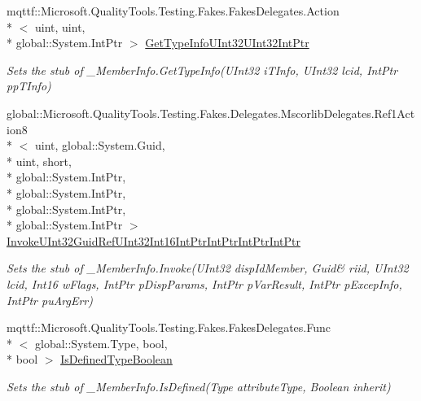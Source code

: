 \begin{DoxyCompactItemize}
mqttf\-::\-Microsoft.\-Quality\-Tools.\-Testing.\-Fakes.\-Fakes\-Delegates.\-Action\\*
$<$ uint, uint, \\*
global\-::\-System.\-Int\-Ptr $>$ \hyperlink{class_system_1_1_runtime_1_1_interop_services_1_1_fakes_1_1_stub___member_info_a767cd0a1bdff27bc6c121b4490e7abb8}{Get\-Type\-Info\-U\-Int32\-U\-Int32\-Int\-Ptr}
\begin{DoxyCompactList}\small\item\em Sets the stub of \-\_\-\-Member\-Info.\-Get\-Type\-Info(\-U\-Int32 i\-T\-Info, U\-Int32 lcid, Int\-Ptr pp\-T\-Info)\end{DoxyCompactList}\item 
global\-::\-Microsoft.\-Quality\-Tools.\-Testing.\-Fakes.\-Delegates.\-Mscorlib\-Delegates.\-Ref1\-Action8\\*
$<$ uint, global\-::\-System.\-Guid, \\*
uint, short, \\*
global\-::\-System.\-Int\-Ptr, \\*
global\-::\-System.\-Int\-Ptr, \\*
global\-::\-System.\-Int\-Ptr, \\*
global\-::\-System.\-Int\-Ptr $>$ \hyperlink{class_system_1_1_runtime_1_1_interop_services_1_1_fakes_1_1_stub___member_info_a5e559ad6c74fafd83ae430087469da57}{Invoke\-U\-Int32\-Guid\-Ref\-U\-Int32\-Int16\-Int\-Ptr\-Int\-Ptr\-Int\-Ptr\-Int\-Ptr}
\begin{DoxyCompactList}\small\item\em Sets the stub of \-\_\-\-Member\-Info.\-Invoke(U\-Int32 disp\-Id\-Member, Guid\& riid, U\-Int32 lcid, Int16 w\-Flags, Int\-Ptr p\-Disp\-Params, Int\-Ptr p\-Var\-Result, Int\-Ptr p\-Excep\-Info, Int\-Ptr pu\-Arg\-Err)\end{DoxyCompactList}\item 
mqttf\-::\-Microsoft.\-Quality\-Tools.\-Testing.\-Fakes.\-Fakes\-Delegates.\-Func\\*
$<$ global\-::\-System.\-Type, bool, \\*
bool $>$ \hyperlink{class_system_1_1_runtime_1_1_interop_services_1_1_fakes_1_1_stub___member_info_a054233ad0983ab6b99d368be408f23be}{Is\-Defined\-Type\-Boolean}
\begin{DoxyCompactList}\small\item\em Sets the stub of \-\_\-\-Member\-Info.\-Is\-Defined(\-Type attribute\-Type, Boolean inherit)\end{DoxyCompactList}\item 

\end{DoxyCompactItemize}
